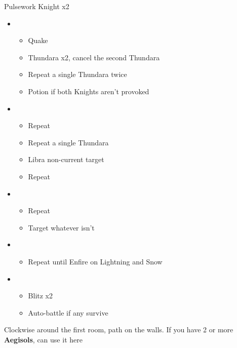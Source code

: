 \begin{battle}{Pulsework Knight x2}
\begin{itemize}
    \item \first
    \begin{itemize}
        \item Quake
        \item Thundara x2, cancel the second Thundara
        \item Repeat a single Thundara twice
        \item Potion if both Knights aren't provoked
    \end{itemize}
    \item \third
    \begin{itemize}
        \item Repeat
        \item Repeat a single Thundara
        \item Libra non-current target
        \item Repeat
    \end{itemize}
    \item \fourth
    \begin{itemize}
        \item Repeat
        \item Target whatever isn't \stagger
    \end{itemize}
    \item \fifth
    \begin{itemize}
        \item Repeat until Enfire on Lightning and Snow
    \end{itemize}
    \item \sixth
    \begin{itemize}
        \item Blitz x2
        \item Auto-battle if any survive
    \end{itemize}
\end{itemize}
\end{battle}
Clockwise around the first room, path on the walls.
\newpage
If you have 2 or more \textbf{Aegisols}, can use it here
